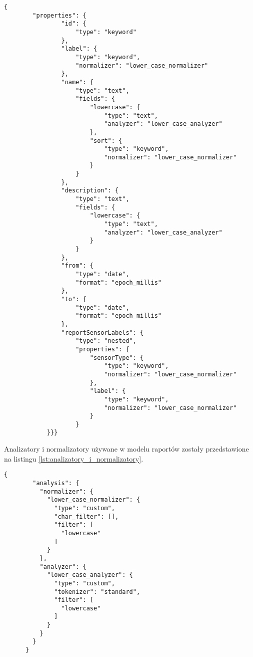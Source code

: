 \begin{lstlisting}[caption=Model raportów w bazie danych Elasticsearch, label={lst:model_raportow}]
    {
        "properties": {
                "id": {
                    "type": "keyword"
                },
                "label": {
                    "type": "keyword",
                    "normalizer": "lower_case_normalizer"
                },
                "name": {
                    "type": "text",
                    "fields": {
                        "lowercase": {
                            "type": "text",
                            "analyzer": "lower_case_analyzer"
                        },
                        "sort": {
                            "type": "keyword",
                            "normalizer": "lower_case_normalizer"
                        }
                    }
                },
                "description": {
                    "type": "text",
                    "fields": {
                        "lowercase": {
                            "type": "text",
                            "analyzer": "lower_case_analyzer"
                        }
                    }
                },
                "from": {
                    "type": "date",
                    "format": "epoch_millis"
                },
                "to": {
                    "type": "date",
                    "format": "epoch_millis"
                },
                "reportSensorLabels": {
                    "type": "nested",
                    "properties": {
                        "sensorType": {
                            "type": "keyword",
                            "normalizer": "lower_case_normalizer"
                        },
                        "label": {
                            "type": "keyword",
                            "normalizer": "lower_case_normalizer"
                        }
                    }
            }}}
    \end{lstlisting}


Analizatory i normalizatory używane w modelu raportów zostały przedstawione na listingu \ref{lst:analizatory_i_normalizatory}.

\begin{lstlisting}[caption=Analizatory i normalizatory w bazie danych Elasticsearch, label={lst:analizatory_i_normalizatory}]
    {
        "analysis": {
          "normalizer": {
            "lower_case_normalizer": {
              "type": "custom",
              "char_filter": [],
              "filter": [
                "lowercase"
              ]
            }
          },
          "analyzer": {
            "lower_case_analyzer": {
              "type": "custom",
              "tokenizer": "standard",
              "filter": [
                "lowercase"
              ]
            }
          }
        }
      }
\end{lstlisting}

